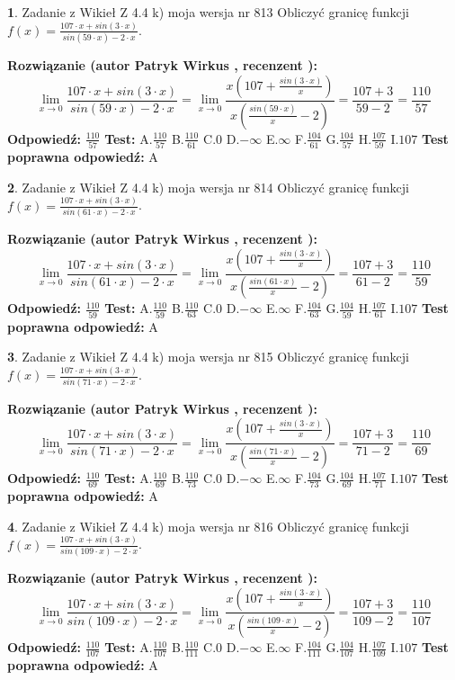 \documentclass[12pt, a4paper]{article}
\theoremstyle{definition} %
\newtheorem{zad}{}
\newcommand{\zadStart}[1]{\begin{zad}#1\newline}
\newcommand{\zadStop}{\end{zad}}
\newcommand{\rozwStart}[2]{\noindent \textbf{Rozwiązanie (autor #1 , recenzent #2): }\newline}
\newcommand{\rozwStop}{\newline}
\newcommand{\odpStart}{\noindent \textbf{Odpowiedź:}\newline}
\newcommand{\odpStop}{\newline}
\newcommand{\testStart}{\noindent \textbf{Test:}\newline}
\newcommand{\testStop}{\newline}
\newcommand{\kluczStart}{\noindent \textbf{Test poprawna odpowiedź:}\newline}
\newcommand{\kluczStop}{\newline}
\begin{document}
\zadStart{Zadanie z Wikieł Z 4.4 k) moja wersja nr 813}
Obliczyć granicę funkcji $f(x)=\frac{107\cdot x +sin(3\cdot x)}{sin(59\cdot x) -2\cdot x}$.
\zadStop
\rozwStart{Patryk Wirkus}{}
$$\lim\limits_{x\to 0}\frac{107\cdot x +sin(3\cdot x)}{sin(59\cdot x) -2\cdot x}
=\lim\limits_{x\to 0}\frac{x(107+\frac{sin(3\cdot x)}{x})}{x(\frac{sin(59\cdot x)}{x}-2)}
=\frac{107+3}{59-2} = \frac{110}{57}$$
\rozwStop
\odpStart
$\frac{110}{57}$
\odpStop
\testStart
A.$\frac{110}{57}$
B.$\frac{110}{61}$
C.$0$
D.$-\infty$
E.$\infty$
F.$\frac{104}{61}$
G.$\frac{104}{57}$
H.$\frac{107}{59}$
I.$107$
\testStop
\kluczStart
A
\kluczStop



\zadStart{Zadanie z Wikieł Z 4.4 k) moja wersja nr 814}
Obliczyć granicę funkcji $f(x)=\frac{107\cdot x +sin(3\cdot x)}{sin(61\cdot x) -2\cdot x}$.
\zadStop
\rozwStart{Patryk Wirkus}{}
$$\lim\limits_{x\to 0}\frac{107\cdot x +sin(3\cdot x)}{sin(61\cdot x) -2\cdot x}
=\lim\limits_{x\to 0}\frac{x(107+\frac{sin(3\cdot x)}{x})}{x(\frac{sin(61\cdot x)}{x}-2)}
=\frac{107+3}{61-2} = \frac{110}{59}$$
\rozwStop
\odpStart
$\frac{110}{59}$
\odpStop
\testStart
A.$\frac{110}{59}$
B.$\frac{110}{63}$
C.$0$
D.$-\infty$
E.$\infty$
F.$\frac{104}{63}$
G.$\frac{104}{59}$
H.$\frac{107}{61}$
I.$107$
\testStop
\kluczStart
A
\kluczStop



\zadStart{Zadanie z Wikieł Z 4.4 k) moja wersja nr 815}
Obliczyć granicę funkcji $f(x)=\frac{107\cdot x +sin(3\cdot x)}{sin(71\cdot x) -2\cdot x}$.
\zadStop
\rozwStart{Patryk Wirkus}{}
$$\lim\limits_{x\to 0}\frac{107\cdot x +sin(3\cdot x)}{sin(71\cdot x) -2\cdot x}
=\lim\limits_{x\to 0}\frac{x(107+\frac{sin(3\cdot x)}{x})}{x(\frac{sin(71\cdot x)}{x}-2)}
=\frac{107+3}{71-2} = \frac{110}{69}$$
\rozwStop
\odpStart
$\frac{110}{69}$
\odpStop
\testStart
A.$\frac{110}{69}$
B.$\frac{110}{73}$
C.$0$
D.$-\infty$
E.$\infty$
F.$\frac{104}{73}$
G.$\frac{104}{69}$
H.$\frac{107}{71}$
I.$107$
\testStop
\kluczStart
A
\kluczStop



\zadStart{Zadanie z Wikieł Z 4.4 k) moja wersja nr 816}
Obliczyć granicę funkcji $f(x)=\frac{107\cdot x +sin(3\cdot x)}{sin(109\cdot x) -2\cdot x}$.
\zadStop
\rozwStart{Patryk Wirkus}{}
$$\lim\limits_{x\to 0}\frac{107\cdot x +sin(3\cdot x)}{sin(109\cdot x) -2\cdot x}
=\lim\limits_{x\to 0}\frac{x(107+\frac{sin(3\cdot x)}{x})}{x(\frac{sin(109\cdot x)}{x}-2)}
=\frac{107+3}{109-2} = \frac{110}{107}$$
\rozwStop
\odpStart
$\frac{110}{107}$
\odpStop
\testStart
A.$\frac{110}{107}$
B.$\frac{110}{111}$
C.$0$
D.$-\infty$
E.$\infty$
F.$\frac{104}{111}$
G.$\frac{104}{107}$
H.$\frac{107}{109}$
I.$107$
\testStop
\kluczStart
A
\kluczStop
\end{document}
